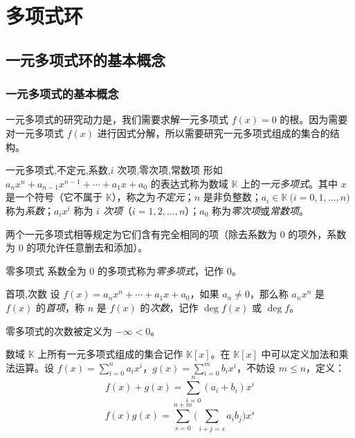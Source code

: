 
\chapter{多项式环}

\section{一元多项式环的基本概念}

\subsection{一元多项式的基本概念}

一元多项式的研究动力是，我们需要求解一元多项式 $f(x) = 0$ 的根。因为需要对一元多项式 $f(x)$ 进行因式分解，所以需要研究一元多项式组成的集合的结构。

\begin{definition}{一元多项式,不定元,系数,$i$ 次项,零次项,常数项}
	形如 $a_n x^n + a_{n - 1} x^{n - 1} + \cdots + a_1 x + a_0$ 的表达式称为数域 $\mathbb K$ 上的\emph{一元多项式}。其中 $x$ 是一个符号（它不属于 $\mathbb K$），称之为\emph{不定元}；$n$ 是非负整数；$a_i \in \mathbb K \pod{i = 0, 1, \ldots, n}$ 称为\emph{系数}；$a_i x^i$ 称为 \emph{$i$ 次项}（$i = 1, 2, \ldots, n$）；$a_0$ 称为\emph{零次项}或\emph{常数项}。
\end{definition}

两个一元多项式相等规定为它们含有完全相同的项（除去系数为 $0$ 的项外，系数为 $0$ 的项允许任意删去和添加）。

\begin{definition}{零多项式}
	系数全为 $0$ 的多项式称为\emph{零多项式}，记作 $0$。
\end{definition}

\begin{definition}{首项,次数}
	设 $f(x) = a_n x^n + \cdots + a_1 x + a_0$，如果 $a_n \ne 0$，那么称 $a_n x^n$ 是 $f(x)$ 的\emph{首项}，称 $n$ 是 $f(x)$ 的\emph{次数}，记作 $\deg f(x)$ 或 $\deg f$。
\end{definition}

零多项式的次数被定义为 $-\infty < 0$。

\bigskip

数域 $\mathbb K$ 上所有一元多项式组成的集合记作 $\mathbb K[x]$。在 $\mathbb K[x]$ 中可以定义加法和乘法运算。设 $f(x) = \sum\limits_{i = 0}^n a_i x^i$，$g(x) = \sum\limits_{i = 0}^m b_i x^i$，不妨设 $m \le n$，定义：
$$
f(x) + g(x) = \sum_{i = 0}^n (a_i + b_i) x^i
$$$$
f(x) g(x) = \sum_{s = 0}^{n + m} \biggl( \sum_{i + j = s} a_i b_j \biggr) x^s
$$

